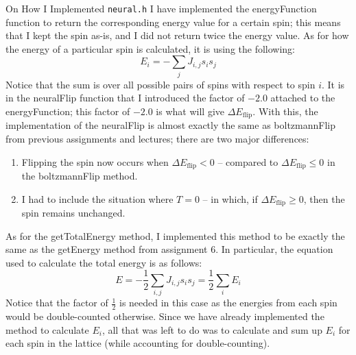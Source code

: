 \begin{remarkBox}{On How I Implemented \texttt{neural.h}}
I have implemented the energyFunction function to return the corresponding
energy value for a certain spin; this means that I kept the spin as-is, and I did not 
return twice the energy value. 
As for how the energy of a particular spin is calculated, it is using the following:
\begin{equation*}
    E_{ i }
    =
    - \sum_{ j } J_{ i, j } s_{ i } s_{ j }
\end{equation*}
Notice that the sum is over all possible pairs of spins with respect to spin \( i \).
It is in the neuralFlip function that I introduced the factor of \( - 2.0 \) attached
to the energyFunction; this factor of \( - 2.0 \) is what will give 
\( \Delta E_{ \text{flip} } \). 
With this, the implementation of the neuralFlip is almost exactly the same as 
boltzmannFlip from previous assignments and lectures; there are two major differences:

\begin{enumerate}
    \item Flipping the spin now occurs when \( \Delta E_{ \text{flip} } < 0 \) --
        compared to \( \Delta E_{ \text{flip} } \leq 0 \) in the boltzmannFlip method.
    \item I had to include the situation where \( T = 0 \) -- in which, if 
    \( \Delta E_{ \text{flip} } \geq 0 \), then the spin remains unchanged.
\end{enumerate}

As for the getTotalEnergy method, I implemented this method to be exactly the same 
as the getEnergy method from assignment 6. 
In particular, the equation used to calculate the total energy is as follows:
\begin{equation*}
    E
    =
    - \frac{ 1 }{ 2 } \sum_{ i, j } J_{ i, j } s_{ i } s_{ j }
    =
    \frac{ 1 }{ 2 } \sum_{ i } E_{ i }
\end{equation*}
Notice that the factor of \( \frac{ 1 }{ 2 } \) is needed in this case as the energies 
from each spin would be double-counted otherwise. 
Since we have already implemented the method to calculate \( E_{ i } \), all that 
was left to do was to calculate and sum up \( E_{ i } \) for each spin in the lattice 
(while accounting for double-counting).
\end{remarkBox}